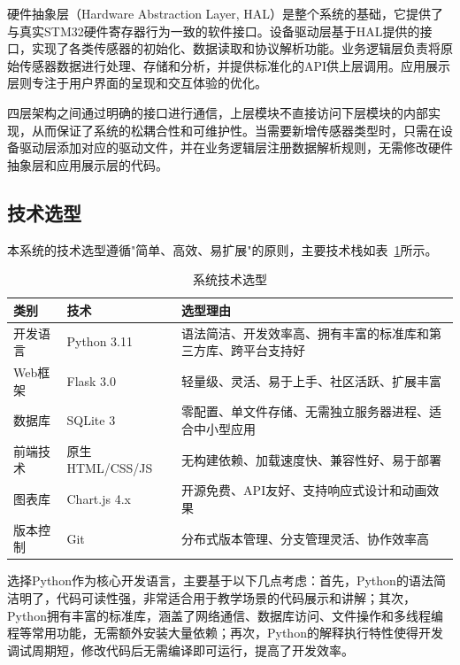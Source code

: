 \documentclass[12pt,a4paper]{ctexart}
\begin{document}
硬件抽象层（Hardware Abstraction Layer, HAL）是整个系统的基础，它提供了与真实STM32硬件寄存器行为一致的软件接口。设备驱动层基于HAL提供的接口，实现了各类传感器的初始化、数据读取和协议解析功能。业务逻辑层负责将原始传感器数据进行处理、存储和分析，并提供标准化的API供上层调用。应用展示层则专注于用户界面的呈现和交互体验的优化。

四层架构之间通过明确的接口进行通信，上层模块不直接访问下层模块的内部实现，从而保证了系统的松耦合性和可维护性。当需要新增传感器类型时，只需在设备驱动层添加对应的驱动文件，并在业务逻辑层注册数据解析规则，无需修改硬件抽象层和应用展示层的代码。

\subsection{技术选型}

本系统的技术选型遵循"简单、高效、易扩展"的原则，主要技术栈如表~\ref{tab:tech}所示。

\begin{table}[H]
    \centering
    \caption{系统技术选型}
    \label{tab:tech}
    \begin{tabular}{@{}llp{7cm}@{}}
        \toprule
        \textbf{类别} & \textbf{技术} & \textbf{选型理由} \\
        \midrule
        开发语言 & Python 3.11 & 语法简洁、开发效率高、拥有丰富的标准库和第三方库、跨平台支持好 \\
        Web框架 & Flask 3.0 & 轻量级、灵活、易于上手、社区活跃、扩展丰富 \\
        数据库 & SQLite 3 & 零配置、单文件存储、无需独立服务器进程、适合中小型应用 \\
        前端技术 & 原生HTML/CSS/JS & 无构建依赖、加载速度快、兼容性好、易于部署 \\
        图表库 & Chart.js 4.x & 开源免费、API友好、支持响应式设计和动画效果 \\
        版本控制 & Git & 分布式版本管理、分支管理灵活、协作效率高 \\
        \bottomrule
    \end{tabular}
\end{table}

选择Python作为核心开发语言，主要基于以下几点考虑：首先，Python的语法简洁明了，代码可读性强，非常适合用于教学场景的代码展示和讲解；其次，Python拥有丰富的标准库，涵盖了网络通信、数据库访问、文件操作和多线程编程等常用功能，无需额外安装大量依赖；再次，Python的解释执行特性使得开发调试周期短，修改代码后无需编译即可运行，提高了开发效率。
\end{document}
